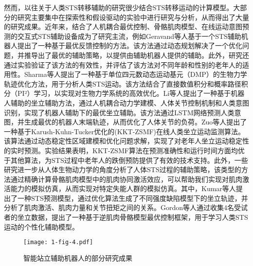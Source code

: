 然而，以往关于人类STS转移辅助的研究很少结合STS转移运动的计算模型。大部分的研究主要集中在探索性和假设驱动的实验中进行研究与分析，从而得出了大量的研究成果。近年来，结合了人机耦合最优控制、骨骼肌肉模型、在线运动意图预测的交互式STS辅助设备成为了研究主流，例如Geravand等人\cite{geravandHumanSittostandTransfer2017}基于一个STS辅助机器人提出了一种基于最优反馈控制的方法。该方法通过动态规划解决了一个优化问题，并推导出了最优的辅助策略，以提供由辅助机器人提供的辅助。此外，研究还通过实验验证了该方法的有效性，并评估了该方法对不同年龄和性别的老年人的适用性。Sharma等人\cite{sharmaBiomechanicalTrajectoryOptimization2022,sharmaPhysicalHumanRobotInteraction2022}提出了一种基于单位四元数动态运动基元（DMP）的生物力学轨迹优化方法，用于分析人类STS运动。该方法结合了直接数值积分和概率路径积分（PI²）学习，以实现对生物力学系统的高效优化。Li等人\cite{liIntegratedApproachRobotic2021,liHumanCenteredControlFramework2018}提出了一种基于机器人辅助的坐立辅助方法，通过人机耦合动力学建模、人体关节控制机制和人类意图识别，实现了机器人辅助下的最优坐立辅助。该方法通过LSTM网络预测人类意图，并生成最优的机器人末端轨迹，从而优化了人体关节的负荷。Zuo等人\cite{zuoOnlineMonitoringHuman2023}提出了一种基于Karush-Kuhn-Tucker优化的(KKT-ZSMF)在线人类坐立运动监测算法。该算法通过动态稳定性区域建模和优化问题求解，实现了对老年人坐立运动稳定性的实时预测。实验结果表明，KKT-ZSMF算法在预测准确性和运行时间方面均优于其他算法，为STS过程中老年人的跌倒预防提供了有效的技术支持。此外，一些研究进一步从人体生物动力学的角度分析了人体STS过程的辅助策略，该类型的方法通过精确计算骨骼肌肉模型中的肌肉协同激活效应，可以帮助我们实现对肌肉激活能力的模拟仿真，从而实现对特定失能人群的模拟仿真。其中，Kumar等人\cite{kumarPredictingSittoStandAdaptations2022}提出了一种STS预测模型，通过优化算法生成了不同强度缺陷模型下的坐立轨迹，并分析了肌肉激活、肌肉力量和关节扭矩之间的关系。Gordon等人\cite{gordonLearningPersonalisedHuman2023a}通过收集4名受试者的坐立数据，提出了一种基于逆肌肉骨骼模型最优控制框架，用于学习人类STS运动的个性化辅助模型。

\begin{figure}[h]
  \centering
  \texttt{[image: 1-fig-4.pdf]}
  \caption{智能站立辅助机器人的部分研究成果}
  \label{fig:1-4}
\end{figure}

